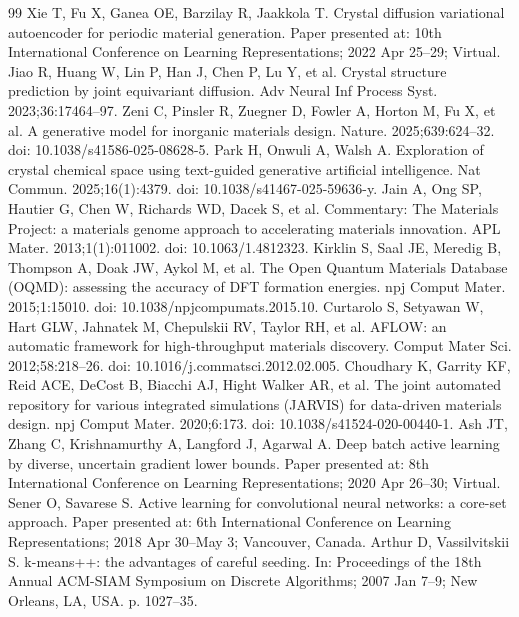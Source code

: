 \begin{thebibliography}{99}
 Xie T, Fu X, Ganea OE, Barzilay R, Jaakkola T. Crystal diffusion variational autoencoder for periodic material generation. Paper presented at: 10th International Conference on Learning Representations; 2022 Apr 25--29; Virtual.
 Jiao R, Huang W, Lin P, Han J, Chen P, Lu Y, et al. Crystal structure prediction by joint equivariant diffusion. Adv Neural Inf Process Syst. 2023;36:17464--97.
 Zeni C, Pinsler R, Zuegner D, Fowler A, Horton M, Fu X, et al. A generative model for inorganic materials design. Nature. 2025;639:624--32. doi: 10.1038/s41586-025-08628-5.
 Park H, Onwuli A, Walsh A. Exploration of crystal chemical space using text-guided generative artificial intelligence. Nat Commun. 2025;16(1):4379. doi: 10.1038/s41467-025-59636-y.
 Jain A, Ong SP, Hautier G, Chen W, Richards WD, Dacek S, et al. Commentary: The Materials Project: a materials genome approach to accelerating materials innovation. APL Mater. 2013;1(1):011002. doi: 10.1063/1.4812323.
 Kirklin S, Saal JE, Meredig B, Thompson A, Doak JW, Aykol M, et al. The Open Quantum Materials Database (OQMD): assessing the accuracy of DFT formation energies. npj Comput Mater. 2015;1:15010. doi: 10.1038/npjcompumats.2015.10.
 Curtarolo S, Setyawan W, Hart GLW, Jahnatek M, Chepulskii RV, Taylor RH, et al. AFLOW: an automatic framework for high-throughput materials discovery. Comput Mater Sci. 2012;58:218--26. doi: 10.1016/j.commatsci.2012.02.005.
 Choudhary K, Garrity KF, Reid ACE, DeCost B, Biacchi AJ, Hight Walker AR, et al. The joint automated repository for various integrated simulations (JARVIS) for data-driven materials design. npj Comput Mater. 2020;6:173. doi: 10.1038/s41524-020-00440-1.
 Ash JT, Zhang C, Krishnamurthy A, Langford J, Agarwal A. Deep batch active learning by diverse, uncertain gradient lower bounds. Paper presented at: 8th International Conference on Learning Representations; 2020 Apr 26--30; Virtual.
 Sener O, Savarese S. Active learning for convolutional neural networks: a core-set approach. Paper presented at: 6th International Conference on Learning Representations; 2018 Apr 30--May 3; Vancouver, Canada.
 Arthur D, Vassilvitskii S. k-means++: the advantages of careful seeding. In: Proceedings of the 18th Annual ACM-SIAM Symposium on Discrete Algorithms; 2007 Jan 7--9; New Orleans, LA, USA. p. 1027--35.

\end{thebibliography}

